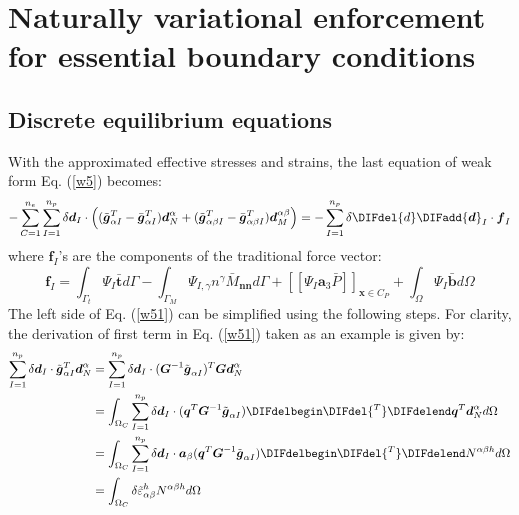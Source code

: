 \section{Naturally variational enforcement for essential boundary conditions}\label{boundary}
\subsection{Discrete equilibrium equations}
With the approximated effective stresses and strains, the last equation of weak form Eq. (\ref{w5}) becomes:
\begin{equation}\label{w51}
- \sum_{C=1}^{n_e}\sum_{I=1}^{n_p} \delta \boldsymbol d_I \cdot \left ( (\tilde{\boldsymbol g}^T_{\alpha I} - \bar{\boldsymbol g}^T_{\alpha I}) \boldsymbol d_N^{\alpha}
    + (\tilde{\boldsymbol g}^T_{\alpha\beta I} - \bar{\boldsymbol g}^T_{\alpha\beta I}) \boldsymbol d_M^{\alpha\beta} \right ) = - \sum_{I=1}^{n_p}\delta \DIFdel{d} \DIFadd{\boldsymbol d}_I \cdot \boldsymbol f_I
\end{equation}
where $\boldsymbol f_I$'s are the components of the traditional force vector:
\begin{equation}
        \boldsymbol f_I = \int_{\Gamma_t} \Psi_I \bar{\boldsymbol t} d\Gamma - \int_{\Gamma_M} \Psi_{I,\gamma} n^\gamma \bar M_{\boldsymbol{nn}} d\Gamma + [[\Psi_I\boldsymbol a_3 \bar P]]_{\boldsymbol x\in C_P} + \int_\Omega \Psi_I \bar{\boldsymbol b} d\Omega
\end{equation}
The left side of Eq. (\ref{w51}) can be simplified using the following steps. For clarity, the derivation of first term in Eq. (\ref{w51}) taken as an example is given by:
\begin{equation}
\begin{split}
\sum_{I=1}^{n_p} \delta \boldsymbol d_I \cdot \tilde{\boldsymbol g}^T_{\alpha I} \boldsymbol d_N^\alpha 
&= \sum_{I=1}^{n_p} \delta \boldsymbol d_I \cdot (\boldsymbol G^{-1} \tilde{\boldsymbol g}_{\alpha I})^T  \boldsymbol G \boldsymbol d^\alpha_N \\
&= \int_{\Omega_C} \sum_{I=1}^{n_p} \delta \boldsymbol d_I \cdot (\boldsymbol q^T\boldsymbol G^{-1} \tilde{\boldsymbol g}_{\alpha I})  \DIFdelbegin \DIFdel{^T  }\DIFdelend \boldsymbol q^T \boldsymbol d^\alpha_N d\Omega \\
&= \int_{\Omega_C} \sum_{I=1}^{n_p} \delta \boldsymbol d_I \cdot \boldsymbol a_\beta(\boldsymbol q^T\boldsymbol G^{-1} \tilde{\boldsymbol g}_{\alpha I})  \DIFdelbegin \DIFdel{^T  }\DIFdelend N^{\alpha\beta h} d\Omega \\
& = \int_{\Omega_C} \delta \tilde \varepsilon_{\alpha\beta}^h N^{\alpha\beta h} d\Omega 
\end{split}
\end{equation}
